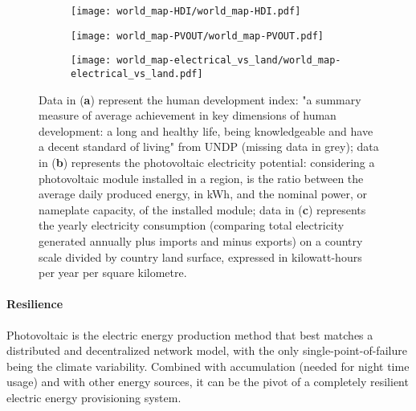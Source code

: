 \begin{figure}%
        \centering
        \begin{subfigure}[b]{1\textwidth}
                \texttt{[image: world\_map-HDI/world\_map-HDI.pdf]}
                \label{fig:world_map-HDI}
        \end{subfigure}
        
        \begin{subfigure}[b]{1\textwidth}
                \texttt{[image: world\_map-PVOUT/world\_map-PVOUT.pdf]}
                \label{fig:world_map-PVOUT}
        \end{subfigure}
    
        \begin{subfigure}[b]{1\textwidth}
    		\texttt{[image: world\_map-electrical\_vs\_land/world\_map-electrical\_vs\_land.pdf]}
    		\label{fig:world_map-electrical_vs_land}
    	\end{subfigure}
        \caption{Data in (\textbf{a}) represent the human development index: 
        	"a summary measure of average achievement in key dimensions of human development: a long and healthy life, being knowledgeable and have a decent standard of living"
        	from UNDP\cite{UNDP2018} (missing data in grey); data in (\textbf{b}) represents the photovoltaic electricity potential: considering a photovoltaic module installed in a region, is the ratio between the average daily produced energy, in kWh, and the nominal power, or nameplate capacity, of the installed module;\cite{Solargis2018} data in (\textbf{c}) represents the yearly electricity consumption\cite{CIAa} (comparing total electricity generated annually plus imports and minus exports) on a country scale divided by country land surface,\cite{CIA} expressed in kilowatt-hours per year per square kilometre.}\label{fig:world_map}
\end{figure}

 \paragraph{Resilience} Photovoltaic is the electric energy production method that best matches a distributed and decentralized network model, with the only single-point-of-failure being the climate variability.
 Combined with accumulation (needed for night time usage) and with other energy sources, it can be the pivot of a completely resilient electric energy provisioning system.

